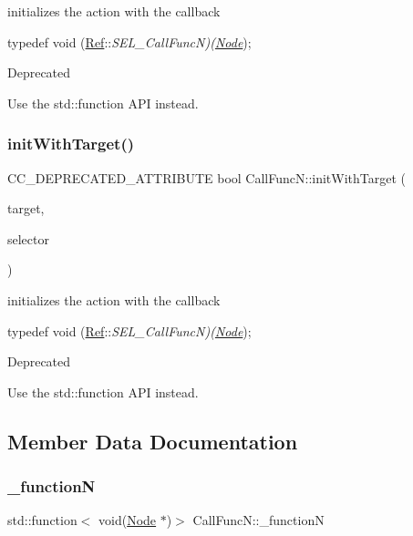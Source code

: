 initializes the action with the callback

typedef void (\hyperlink{classRef}{Ref}\+:\+:{\itshape S\+E\+L\+\_\+\+Call\+FuncN)(\hyperlink{classNode}{Node}}); \begin{DoxyRefDesc}{Deprecated}
\item[\hyperlink{deprecated__deprecated000016}{Deprecated}]Use the std\+::function A\+PI instead. \end{DoxyRefDesc}
\mbox{\label{classCallFuncN_ae850468e8908d4a5026b1112106c8ca4}} 
\subsubsection{\texorpdfstring{init\+With\+Target()}{initWithTarget()}\hspace{0.1cm}{\footnotesize\ttfamily [2/2]}}
{\footnotesize\ttfamily C\+C\+\_\+\+D\+E\+P\+R\+E\+C\+A\+T\+E\+D\+\_\+\+A\+T\+T\+R\+I\+B\+U\+TE bool Call\+Func\+N\+::init\+With\+Target (\begin{DoxyParamCaption}\item[{\hyperlink{classRef}{Ref} $\ast$}]{target,  }\item[{S\+E\+L\+\_\+\+Call\+FuncN}]{selector }\end{DoxyParamCaption})}

initializes the action with the callback

typedef void (\hyperlink{classRef}{Ref}\+:\+:{\itshape S\+E\+L\+\_\+\+Call\+FuncN)(\hyperlink{classNode}{Node}}); \begin{DoxyRefDesc}{Deprecated}
\item[\hyperlink{deprecated__deprecated000246}{Deprecated}]Use the std\+::function A\+PI instead. \end{DoxyRefDesc}


\subsection{Member Data Documentation}
\mbox{\label{classCallFuncN_aff197e1b3cf3827a5509366329fa902f}} 
\subsubsection{\texorpdfstring{\+\_\+functionN}{\_functionN}}
{\footnotesize\ttfamily std\+::function$<$ void(\hyperlink{classNode}{Node} $\ast$)$>$ Call\+Func\+N\+::\+\_\+functionN\hspace{0.3cm}{\ttfamily [protected]}}

